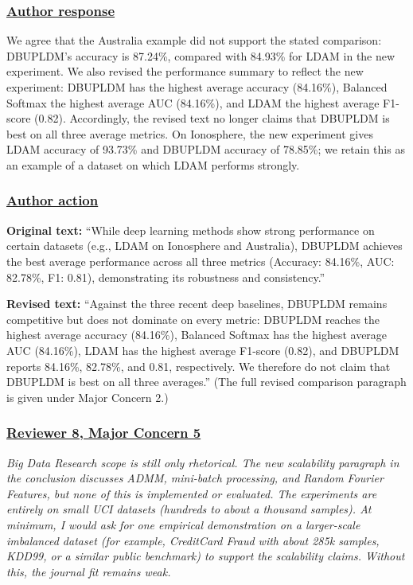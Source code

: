 \documentclass[journal,12pt, onecolumn]{IEEEtran}
\begin{document}
{\color{black}
\subsubsection*{\textbf{\underline{Author response}}}
We agree that the Australia example did not support the stated comparison: DBUPLDM's accuracy is 87.24\%, compared with 84.93\% for LDAM in the new experiment. We also revised the performance summary to reflect the new experiment: DBUPLDM has the highest average accuracy (84.16\%), Balanced Softmax the highest average AUC (84.16\%), and LDAM the highest average F1-score (0.82). Accordingly, the revised text no longer claims that DBUPLDM is best on all three average metrics. On Ionosphere, the new experiment gives LDAM accuracy of 93.73\% and DBUPLDM accuracy of 78.85\%; we retain this as an example of a dataset on which LDAM performs strongly.
}

{\color{black}
\subsubsection*{\textbf{\underline{Author action}}}
\begin{center}
{\color{red}}
\end{center}
\textbf{Original text:} ``While deep learning methods show strong performance on certain datasets (e.g., LDAM on Ionosphere and Australia), DBUPLDM achieves the best average performance across all three metrics (Accuracy: 84.16\%, AUC: 82.78\%, F1: 0.81), demonstrating its robustness and consistency.''

\textbf{Revised text:} ``{\color{red}Against the three recent deep baselines, DBUPLDM remains competitive but does not dominate on every metric: DBUPLDM reaches the highest average accuracy (84.16\%), Balanced Softmax has the highest average AUC (84.16\%), LDAM has the highest average F1-score (0.82), and DBUPLDM reports 84.16\%, 82.78\%, and 0.81, respectively. We therefore do not claim that DBUPLDM is best on all three averages.}'' (The full revised comparison paragraph is given under Major Concern 2.)
}

{\color{customgreen}
\subsubsection*{\underline{\textbf{Reviewer 8, Major Concern 5}}}
\emph{Big Data Research scope is still only rhetorical. The new scalability paragraph in the conclusion discusses ADMM, mini-batch processing, and Random Fourier Features, but none of this is implemented or evaluated. The experiments are entirely on small UCI datasets (hundreds to about a thousand samples). At minimum, I would ask for one empirical demonstration on a larger-scale imbalanced dataset (for example, CreditCard Fraud with about 285k samples, KDD99, or a similar public benchmark) to support the scalability claims. Without this, the journal fit remains weak.}
}
\end{document}
